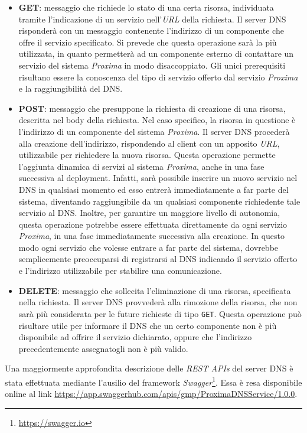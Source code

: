 \documentclass[a4paper,12pt]{report}
\begin{document}
\begin{itemize}
	\item \textbf{GET}: messaggio che richiede lo stato di una certa risorsa, individuata tramite l'indicazione di un servizio nell'\emph{URL} della richiesta. Il server DNS risponderà con un messaggio contenente l'indirizzo di un componente che offre il servizio specificato. \newline Si prevede che questa operazione sarà la più utilizzata, in quanto permetterà ad un componente esterno di contattare un servizio del sistema \emph{Proxima} in modo disaccoppiato. Gli unici prerequisiti risultano essere la conoscenza del tipo di servizio offerto dal servizio \emph{Proxima} e la raggiungibilità del DNS.
	\item \textbf{POST}: messaggio che presuppone la richiesta di creazione di una risorsa, descritta nel body della richiesta. Nel caso specifico, la risorsa in questione è l'indirizzo di un componente del sistema \emph{Proxima}. Il server DNS procederà alla creazione dell'indirizzo, rispondendo al client con un apposito \emph{URL}, utilizzabile per richiedere la nuova risorsa. \newline Questa operazione permette l'aggiunta dinamica di servizi al sistema \emph{Proxima}, anche in una fase successiva al deployment. Infatti, sarà possibile inserire un nuovo servizio nel DNS in qualsiasi momento ed esso entrerà immediatamente a far parte del sistema, diventando raggiungibile da un qualsiasi componente richiedente tale servizio al DNS. Inoltre, per garantire un maggiore livello di autonomia, questa operazione potrebbe essere effettuata direttamente da ogni servizio \emph{Proxima}, in una fase immediatamente successiva alla creazione. In questo modo ogni servizio che volesse entrare a far parte del sistema, dovrebbe semplicemente preoccuparsi di registrarsi al DNS indicando il servizio offerto e l'indirizzo utilizzabile per stabilire una comunicazione.
	\item \textbf{DELETE}: messaggio che sollecita l'eliminazione di una risorsa, specificata nella richiesta. Il server DNS provvederà alla rimozione della risorsa, che non sarà più considerata per le future richieste di tipo \texttt{GET}. \newline Questa operazione può risultare utile per informare il DNS che un certo componente non è più disponibile ad offrire il servizio dichiarato, oppure che l'indirizzo precedentemente assegnatogli non è più valido.
\end{itemize}
Una maggiormente approfondita descrizione delle \emph{REST APIs} del server DNS è stata effettuata mediante l'ausilio del framework \emph{Swagger}\footnote{\url{https://swagger.io}}. Essa è resa disponibile online al link \url{https://app.swaggerhub.com/apis/gmp/ProximaDNSService/1.0.0}.
\end{document}
